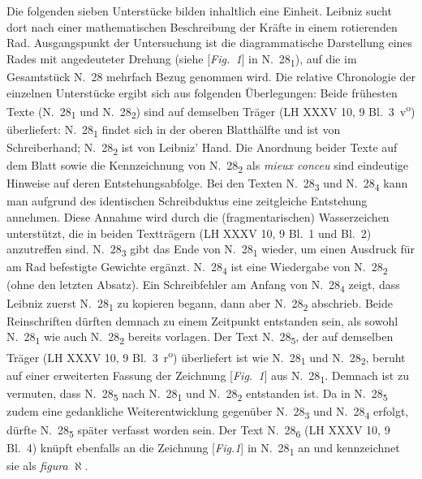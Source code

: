 \footnotesize%
\pstart%
\noindent%
Die folgenden sieben Unterstücke bilden inhaltlich eine Einheit.
Leibniz sucht dort nach einer mathematischen Beschreibung der Kr\"{a}fte in einem rotierenden Rad.
Aus\-gangs\-punkt der Untersuchung ist die diagrammatische Darstellung eines Rades mit angedeuteter Drehung (siehe [\textit{Fig.~1}] in N.~28\textsubscript{1}),
auf die im Gesamtstück N.~28 mehrfach Bezug genommen wird.
Die relative Chronologie der einzelnen Unterstücke ergibt sich aus folgenden Überlegungen:
\pend\pstart%
Beide frühesten Texte (N.~28\textsubscript{1} und N.~28\textsubscript{2}) sind auf demselben Träger (LH XXXV 10, 9 Bl.~3~v\textsuperscript{o}) überliefert:
N.~28\textsubscript{1} findet sich in der oberen Blatth\"{a}lfte und ist von Schreiberhand; N.~28\textsubscript{2} ist von Leibniz' Hand.
Die Anordnung beider Texte auf dem Blatt sowie die Kennzeichnung von N.~28\textsubscript{2} als \textit{mieux conceu} sind eindeutige Hinweise auf deren Entstehungsabfolge.
\pend\pstart%
Bei den Texten N.~28\textsubscript{3} und N.~28\textsubscript{4} kann man aufgrund des identischen Schreibduktus eine zeitgleiche Entstehung annehmen.
Diese Annahme wird durch die (fragmentarischen) Wasserzeichen unterst\"{u}tzt, die in beiden Textträgern (LH XXXV 10, 9 Bl.~1 und Bl.~2) anzutreffen sind.
N.~28\textsubscript{3} gibt das Ende von N.~28\textsubscript{1} wieder, um einen Ausdruck f\"{u}r am Rad befestigte Gewichte erg\"{a}nzt.
N.~28\textsubscript{4} ist eine Wiedergabe von N.~28\textsubscript{2} (ohne den letzten Absatz).
Ein Schreibfehler am Anfang von N.~28\textsubscript{4} zeigt, dass Leibniz zuerst N.~28\textsubscript{1} zu kopieren begann,
dann aber N.~28\textsubscript{2} abschrieb.
Beide Reinschriften dürften demnach zu einem Zeitpunkt entstanden sein, als sowohl N.~28\textsubscript{1} wie auch N.~28\textsubscript{2} bereits vorlagen.
\pend\pstart%
Der Text N.~28\textsubscript{5}, der auf demselben Träger (LH XXXV 10, 9 Bl.~3~r\textsuperscript{o})
überliefert ist wie N.~28\textsubscript{1} und N.~28\textsubscript{2},
beruht auf einer erweiterten Fassung der Zeichnung [\textit{Fig.~1}] aus N.~28\textsubscript{1}.
Demnach ist zu vermuten, dass N.~28\textsubscript{5} nach N.~28\textsubscript{1} und N.~28\textsubscript{2} entstanden ist.
Da in N.~28\textsubscript{5} zudem eine gedankliche Weiterentwicklung gegenüber N.~28\textsubscript{3} und N.~28\textsubscript{4} erfolgt,
dürfte N.~28\textsubscript{5} später verfasst worden sein.
\pend\pstart%
Der Text N.~28\textsubscript{6} (LH XXXV 10, 9 Bl.~4) 
knüpft ebenfalls an die Zeichnung [\textit{Fig.1}] in N.~28\textsubscript{1} an und kennzeichnet sie als \textit{figura} $\aleph$.
